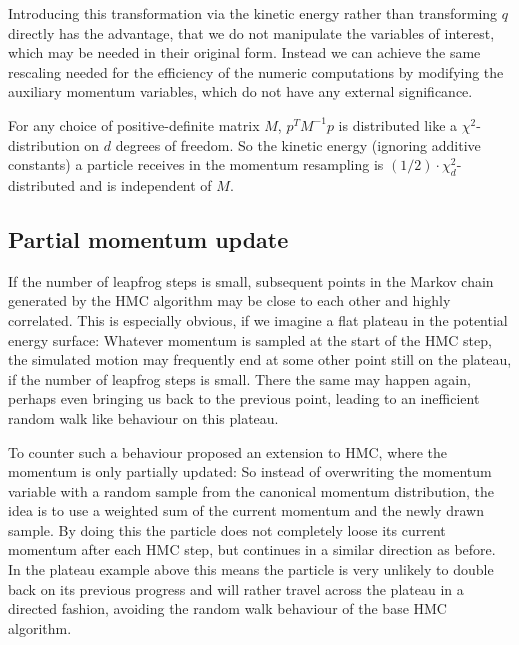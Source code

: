 \documentclass[12pt]{scrartcl}
\begin{document}
Introducing this transformation via the kinetic energy rather than transforming $q$ directly has the advantage, that we do not manipulate the variables of interest, which may be needed in their original form. Instead we can achieve the same rescaling needed for the efficiency of the numeric computations by modifying the auxiliary momentum variables, which do not have any external significance.

For any choice of positive-definite matrix $M$, $p^T M^{-1} p$ is distributed like a $\chi^2$-distribution on $d$ degrees of freedom. So the kinetic energy (ignoring additive constants) a particle receives in the momentum resampling is $(1/2) \cdot \chi^2_d$-distributed and is independent of $M$.

\subsection{Partial momentum update}
\label{sec:PartialMomentumUpdate}
If the number of leapfrog steps is small, subsequent points in the Markov chain generated by the HMC algorithm may be close to each other and highly correlated. This is especially obvious, if we imagine a flat plateau in the potential energy surface: Whatever momentum is sampled at the start of the HMC step, the simulated motion may frequently end at some other point still on the plateau, if the number of leapfrog steps is small. There the same may happen again, perhaps even bringing us back to the previous point, leading to an inefficient random walk like behaviour on this plateau.

To counter such a behaviour \citep{Horowitz1991} proposed an extension to HMC, where the momentum is only partially updated: So instead of overwriting the momentum variable with a random sample from the canonical momentum distribution, the idea is to use a weighted sum of the current momentum and the newly drawn sample. By doing this the particle does not completely loose its current momentum after each HMC step, but continues in a similar direction as before. In the plateau example above this means the particle is very unlikely to double back on its previous progress and will rather travel across the plateau in a directed fashion, avoiding the random walk behaviour of the base HMC algorithm.
\end{document}
